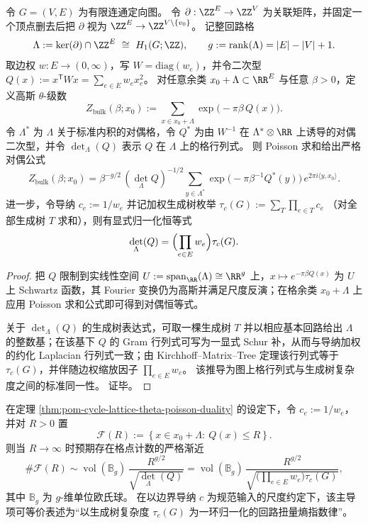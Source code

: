 \begin{theorem}\label{thm:pom-cycle-lattice-theta-poisson-duality}
令 \(G=(V,E)\) 为有限连通定向图。
令 \(\partial:\ZZ^{E}\to\ZZ^{V}\) 为关联矩阵，并固定一个顶点删去后把 \(\partial\) 视为 \(\ZZ^{E}\to\ZZ^{V\setminus\{v_0\}}\)。
记整回路格
\[
\Lambda:=\ker(\partial)\cap\ZZ^{E}\ \cong\ H_1(G;\ZZ),
\qquad
g:=\mathrm{rank}(\Lambda)=|E|-|V|+1.
\]
取边权 \(w:E\to(0,\infty)\)，写 \(W=\mathrm{diag}(w_e)\)，并令二次型 \(Q(x):=x^{\mathsf T}W x=\sum_{e\in E}w_e x_e^2\)。
对任意余类 \(x_0+\Lambda\subset \RR^{E}\) 与任意 \(\beta>0\)，定义高斯 \(\theta\)-级数
\[
Z_{\mathrm{bulk}}(\beta;x_0):=\sum_{x\in x_0+\Lambda}\exp\!\bigl(-\pi\beta\,Q(x)\bigr).
\]
令 \(\Lambda^\ast\) 为 \(\Lambda\) 关于标准内积的对偶格，令 \(Q^\ast\) 为由 \(W^{-1}\) 在 \(\Lambda^\ast\otimes\RR\) 上诱导的对偶二次型，并令 \(\det_{\Lambda}(Q)\) 表示 \(Q\) 在 \(\Lambda\) 上的格行列式。
则 Poisson 求和给出严格对偶公式
\[
Z_{\mathrm{bulk}}(\beta;x_0)
=
\beta^{-g/2}\,(\det_{\Lambda}Q)^{-1/2}
\sum_{y\in \Lambda^\ast}
\exp\!\bigl(-\pi\beta^{-1}Q^\ast(y)\bigr)\,e^{2\pi i\langle y,x_0\rangle}.
\]
进一步，令导纳 \(c_e:=1/w_e\) 并记加权生成树枚举
\(
\tau_c(G):=\sum_T\prod_{e\in T}c_e
\)
（对全部生成树 \(T\) 求和），则有显式归一化恒等式
\[
\det_{\Lambda}(Q)=\Bigl(\prod_{e\in E}w_e\Bigr)\tau_c(G).
\]
\end{theorem}
\begin{proof}
把 \(Q\) 限制到实线性空间 \(U:=\mathrm{span}_{\RR}(\Lambda)\cong\RR^g\) 上，\(x\mapsto e^{-\pi\beta Q(x)}\) 为 \(U\) 上 Schwartz 函数，其 Fourier 变换仍为高斯并满足尺度反演；在格余类 \(x_0+\Lambda\) 上应用 Poisson 求和公式即可得到对偶恒等式。\cite{Iwaniec2002SpectralMethods}
\par
关于 \(\det_{\Lambda}(Q)\) 的生成树表达式，可取一棵生成树 \(T\) 并以相应基本回路给出 \(\Lambda\) 的整数基；在该基下 \(Q\) 的 Gram 行列式可写为一显式 Schur 补，从而与导纳加权的约化 Laplacian 行列式一致；由 Kirchhoff--Matrix--Tree 定理该行列式等于 \(\tau_c(G)\)，并伴随边权缩放因子 \(\prod_{e\in E}w_e\)。
该推导为图上格行列式与生成树复杂度之间的标准同一性。\cite{TerrasZetaGraphs}
证毕。
\end{proof}

\begin{conjecture}\label{conj:pom-godel-stokes-torsor-nongaussian-holography}
在定理 \ref{thm:pom-cycle-lattice-theta-poisson-duality} 的设定下，令 \(c_e:=1/w_e\)，并对 \(R>0\) 置
\[
\mathcal F(R):=\left\{x\in x_0+\Lambda:\ Q(x)\le R\right\}.
\]
则当 \(R\to\infty\) 时预期存在格点计数的严格渐近
\[
\#\mathcal F(R)
\sim
\operatorname{vol}(\mathbb B_g)\,\frac{R^{g/2}}{\sqrt{\det_{\Lambda}(Q)}}
=
\operatorname{vol}(\mathbb B_g)\,\frac{R^{g/2}}{\sqrt{\bigl(\prod_{e\in E}w_e\bigr)\tau_c(G)}},
\]
其中 \(\mathbb B_g\) 为 \(g\)-维单位欧氏球。
在以边界导纳 \(c\) 为规范输入的尺度约定下，该主导项可等价表述为“以生成树复杂度 \(\tau_c(G)\) 为一环归一化的回路扭量熵指数律”。
\end{conjecture}

